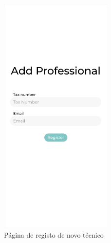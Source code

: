 \begin{figure}[htb]
    \centering
    \includegraphics[width=0.5\textwidth]{images/mockups/account_registering.png}
    \caption{Página de registo de novo técnico}
    \label{fig:24}
\end{figure}